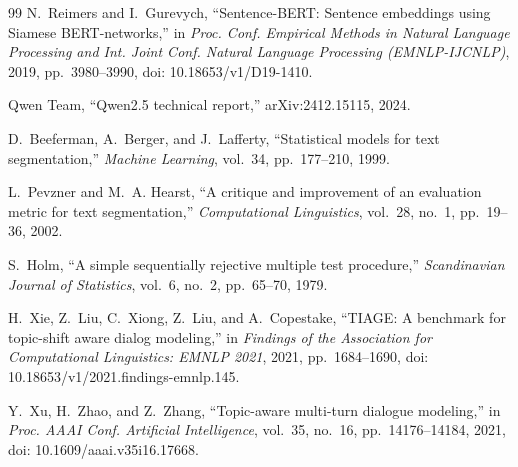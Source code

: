 \documentclass[journal]{IEEEtran}
\begin{document}
\begin{thebibliography}{99}
N.~Reimers and I.~Gurevych, ``Sentence-BERT: Sentence embeddings using Siamese BERT-networks,'' in \emph{Proc. Conf. Empirical Methods in Natural Language Processing and Int. Joint Conf. Natural Language Processing (EMNLP-IJCNLP)}, 2019, pp.~3980--3990, doi: 10.18653/v1/D19-1410.

Qwen Team, ``Qwen2.5 technical report,'' arXiv:2412.15115, 2024.

D.~Beeferman, A.~Berger, and J.~Lafferty, ``Statistical models for text segmentation,'' \emph{Machine Learning}, vol.~34, pp.~177--210, 1999.

L.~Pevzner and M.~A. Hearst, ``A critique and improvement of an evaluation metric for text segmentation,'' \emph{Computational Linguistics}, vol.~28, no.~1, pp.~19--36, 2002.

S.~Holm, ``A simple sequentially rejective multiple test procedure,'' \emph{Scandinavian Journal of Statistics}, vol.~6, no.~2, pp.~65--70, 1979.

H.~Xie, Z.~Liu, C.~Xiong, Z.~Liu, and A.~Copestake, ``TIAGE: A benchmark for topic-shift aware dialog modeling,'' in \emph{Findings of the Association for Computational Linguistics: EMNLP 2021}, 2021, pp.~1684--1690, doi: 10.18653/v1/2021.findings-emnlp.145.

Y.~Xu, H.~Zhao, and Z.~Zhang, ``Topic-aware multi-turn dialogue modeling,'' in \emph{Proc. AAAI Conf. Artificial Intelligence}, vol.~35, no.~16, pp.~14176--14184, 2021, doi: 10.1609/aaai.v35i16.17668.

\end{thebibliography}
\end{document}
